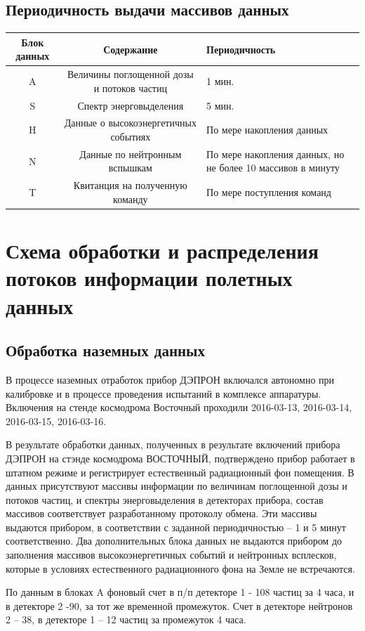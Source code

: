 \subsection{Периодичность выдачи массивов данных}
\begin{center}
	{\small 
		\begin{tabularx}{\textwidth}{|c|c|X|}
			\hline
			Блок данных & Содержание                                 & Периодичность \\ \hline
			     A      & Величины поглощенной дозы и потоков частиц & 1 мин. \\ \hline
			     S      & Спектр энерговыделения                     & 5 мин. \\ \hline
			     H      & Данные о высокоэнергетичных событиях       & По мере накопления данных \\ \hline
			     N      & Данные по нейтронным вспышкам              &  По мере накопления данных, но не более 10 массивов в минуту\\ \hline
			     T      & Квитанция на полученную команду            &  По мере поступления команд\\ \hline
		\end{tabularx}
}
\end{center}



\section{Схема обработки и распределения потоков информации полетных данных}\label{sec3.2}
\subsection{Обработка наземных данных}\label{sec3.2.1}
В процессе наземных отработок прибор ДЭПРОН включался автономно при калибровке и в процессе проведения испытаний в комплексе аппаратуры.  
Включения на стенде космодрома Восточный проходили  
2016-03-13,
2016-03-14,
2016-03-15,
2016-03-16.


В результате обработки данных, полученных в результате включений прибора ДЭПРОН на стэнде космодрома ВОСТОЧНЫЙ, подтверждено прибор работает в штатном режиме и регистрирует естественный радиационный фон помещения.
В данных присутствуют массивы информации по величинам поглощенной дозы и потоков частиц, и спектры энерговыделения в детекторах прибора, состав массивов соответствует разработанному протоколу обмена. Эти массивы выдаются прибором, в соответствии с заданной периодичностью – 1 и 5 минут соответственно. Два дополнительных блока данных не выдаются прибором до заполнения массивов высокоэнергетичных событий и нейтронных всплесков, которые в условиях естественного радиационного фона на Земле не встречаются.

По данным в блоках A фоновый счет в п/п детекторе 1 - 108 частиц за 4 часа, и в детекторе 2 -90, за тот же временной промежуток. Счет в детекторе нейтронов 2 – 38, в детекторе 1 – 12 частиц за промежуток 4  часа.
